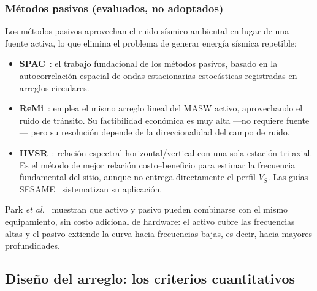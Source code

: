 \subsubsection{M\'etodos pasivos (evaluados, no adoptados)}

Los m\'etodos pasivos aprovechan el ruido s\'ismico ambiental en lugar de una fuente
activa, lo que elimina el problema de generar energ\'ia s\'ismica repetible:

\begin{itemize}[itemsep=0.2em]
    \item \textbf{SPAC}~\cite{Aki1957}: el trabajo fundacional de los m\'etodos pasivos,
    basado en la autocorrelaci\'on espacial de ondas estacionarias estoc\'asticas registradas
    en arreglos circulares.
    \item \textbf{ReMi}~\cite{Louie2001}: emplea el mismo arreglo lineal del MASW activo,
    aprovechando el ruido de tr\'ansito. Su factibilidad econ\'omica es muy alta ---no
    requiere fuente--- pero su resoluci\'on depende de la direccionalidad del campo de
    ruido.
    \item \textbf{HVSR}~\cite{Nakamura1989,Lermo1993}: relaci\'on espectral
    horizontal/vertical con una sola estaci\'on tri-axial. Es el m\'etodo de mejor relaci\'on
    costo--beneficio para estimar la frecuencia fundamental del sitio, aunque no entrega
    directamente el perfil $V_S$. Las gu\'ias SESAME~\cite{SESAME2004} sistematizan su
    aplicaci\'on.
\end{itemize}

Park \emph{et al.}~\cite{Park2007} muestran que activo y pasivo pueden combinarse con el
mismo equipamiento, sin costo adicional de hardware: el activo cubre las frecuencias
altas y el pasivo extiende la curva hacia frecuencias bajas, es decir, hacia mayores
profundidades.


\subsection{Dise\~no del arreglo: los criterios cuantitativos}
\label{sec:estado-arte-arreglo}

